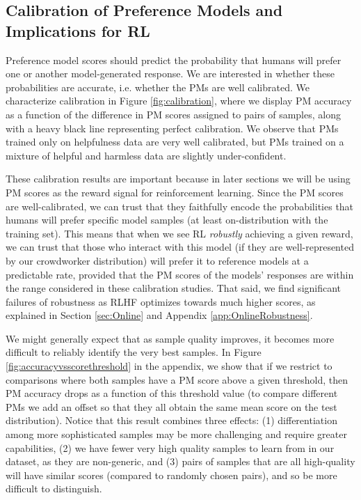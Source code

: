 \subsection{Calibration of Preference Models and Implications for RL}
\label{sec:PMCalibration}

Preference model scores should predict the probability that humans will prefer one or another model-generated response.  We are interested in whether these probabilities are accurate, i.e. whether the PMs are well calibrated.  We characterize calibration in Figure \ref{fig:calibration}, where we display PM accuracy as a function of the difference in PM scores assigned to pairs of samples, along with a heavy black line representing perfect calibration. We observe that PMs trained only on helpfulness data are very well calibrated, but PMs trained on a mixture of helpful and harmless data are slightly under-confident.  

These calibration results are important because in later sections we will be using PM scores as the reward signal for reinforcement learning.  Since the PM scores are well-calibrated, we can trust that they faithfully encode the probabilities that humans will prefer specific model samples (at least on-distribution with the training set).  This means that when we see RL  \emph{robustly} achieving a given reward, we can trust that those who interact with this model (if they are well-represented by our crowdworker distribution) will prefer it to reference models at a predictable rate, provided that the PM scores of the models' responses are within the range considered in these calibration studies. That said, we find significant failures of robustness as RLHF optimizes towards much higher scores, as explained in Section \ref{sec:Online} and Appendix \ref{app:OnlineRobustness}.

We might generally expect that as sample quality improves, it becomes more difficult to reliably identify the very best samples.  In Figure \ref{fig:accuracyvsscorethreshold} in the appendix, we show that if we restrict to comparisons where both samples have a PM score above a given threshold, then PM accuracy drops as a function of this threshold value (to compare different PMs we add an offset so that they all obtain the same mean score on the test distribution).  Notice that this result combines three effects: (1) differentiation among more sophisticated samples may be more challenging and require greater capabilities, (2) we  have fewer very high quality samples to learn from in our dataset, as they are non-generic, and (3) pairs of samples that are all high-quality will have similar scores (compared to randomly chosen pairs), and so be more difficult to distinguish.  


